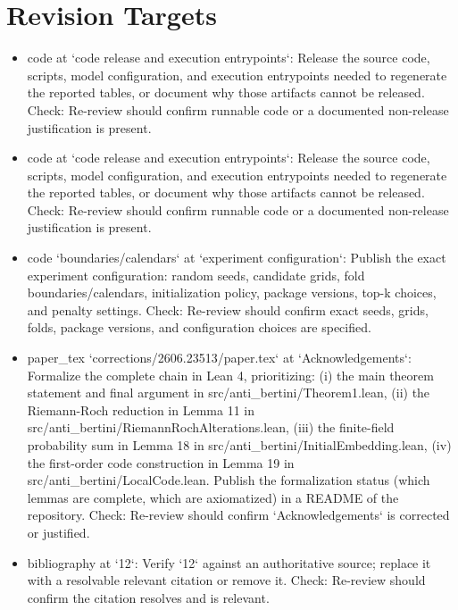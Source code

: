 \documentclass[11pt]{article}
\begin{document}
\section*{Revision Targets}
\begin{itemize}[leftmargin=*]
  \item [open] code at `code release and execution entrypoints`: Release the source code, scripts, model configuration, and execution entrypoints needed to regenerate the reported tables, or document why those artifacts cannot be released. Check: Re-review should confirm runnable code or a documented non-release justification is present.
  \item [open] code at `code release and execution entrypoints`: Release the source code, scripts, model configuration, and execution entrypoints needed to regenerate the reported tables, or document why those artifacts cannot be released. Check: Re-review should confirm runnable code or a documented non-release justification is present.
  \item [open] code `boundaries/calendars` at `experiment configuration`: Publish the exact experiment configuration: random seeds, candidate grids, fold boundaries/calendars, initialization policy, package versions, top-k choices, and penalty settings. Check: Re-review should confirm exact seeds, grids, folds, package versions, and configuration choices are specified.
  \item [open] paper\_tex `corrections/2606.23513/paper.tex` at `Acknowledgements`: Formalize the complete chain in Lean 4, prioritizing: (i) the main theorem statement and final argument in src/anti\_bertini/Theorem1.lean, (ii) the Riemann-Roch reduction in Lemma 11 in src/anti\_bertini/RiemannRochAlterations.lean, (iii) the finite-field probability sum in Lemma 18 in src/anti\_bertini/InitialEmbedding.lean, (iv) the first-order code construction in Lemma 19 in src/anti\_bertini/LocalCode.lean. Publish the formalization status (which lemmas are complete, which are axiomatized) in a README of the repository. Check: Re-review should confirm `Acknowledgements` is corrected or justified.
  \item [open] bibliography at `12`: Verify `12` against an authoritative source; replace it with a resolvable relevant citation or remove it. Check: Re-review should confirm the citation resolves and is relevant.
\end{itemize}
\end{document}
